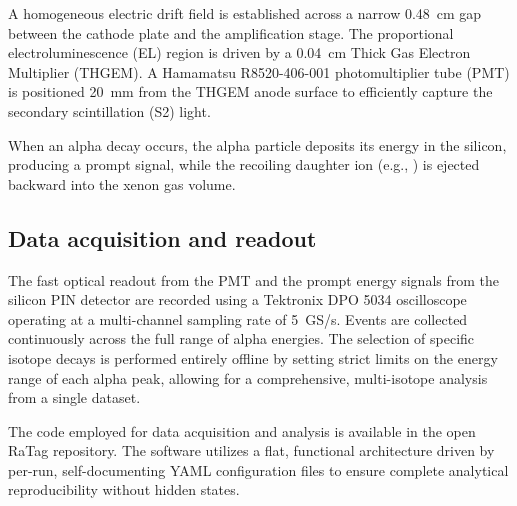 A homogeneous electric drift field is established across a narrow 0.48~cm gap between the cathode
plate and the amplification stage. The proportional electroluminescence (EL) region is driven by a
0.04~cm Thick Gas Electron Multiplier (THGEM). A Hamamatsu R8520-406-001 photomultiplier tube (PMT)
is positioned 20~mm from the THGEM anode surface to efficiently capture the secondary scintillation
(S2) light.

When an alpha decay occurs, the alpha particle deposits its energy in the silicon, producing a
prompt signal, while the recoiling daughter ion (e.g., ) is ejected backward into
the xenon gas volume.

\subsection{Data acquisition and readout}
The fast optical readout from the PMT and the prompt energy signals from the silicon PIN detector
are recorded using a Tektronix DPO 5034 oscilloscope operating at a multi-channel sampling rate of
5~GS/s. Events are collected continuously across the full range of alpha energies. The selection of
specific isotope decays is performed entirely offline by setting strict limits on the energy range
of each alpha peak, allowing for a comprehensive, multi-isotope analysis from a single dataset.

The code employed for data acquisition and analysis is available in the open RaTag repository. The
software utilizes a flat, functional architecture driven by per-run, self-documenting YAML
configuration files to ensure complete analytical reproducibility without hidden states.